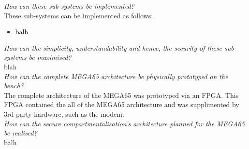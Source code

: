 \textit{How can these sub-systems be implemented?}\\
These sub-systems can be implemented as follows:
\begin{itemize}
\item{balh}
\end{itemize}

\textit{How can the simplicity, understandability and hence, the security of these sub-systems be maximised?}\\
blah
\\
\textit{How can the complete MEGA65 architecture be physically prototyped on the bench?}\\
The complete architecture of the MEGA65 was prototyped via an FPGA. This FPGA contained the all of the MEGA65 architecture and was supplimented by 3rd party hardware, such as the modem.
\\
\textit{How can the secure compartmentalisation's architecture planned for the MEGA65 be realised?}\\
balh
